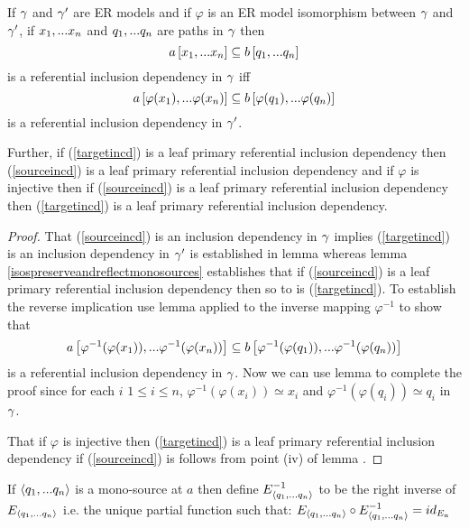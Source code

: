 \begin{lemma}
If $\gamma$ and $\gamma'$ are ER models and  if  $\varphi$ is an ER model isomorphism between $\gamma$  and $\gamma'$,  
if $x_1,...x_n$ and $q_1,...q_n$ are paths in 
$\gamma$
then 
\begin{equation}
\label{sourceincd}
a\left[x_1,...x_n\right]\subseteq b\left[q_1,...q_n\right]
\end{equation}
is a referential inclusion dependency in $\gamma$ 
iff 
\begin{equation}
\label{targetincd}
a\left[\varphi(x_1),...\varphi(x_n)\right]\subseteq b\left[\varphi(q_1),...\varphi(q_n)\right]
\end{equation}
is a referential inclusion dependency in $\gamma'$. 

Further, if (\ref{targetincd}) is a leaf primary referential inclusion dependency  then (\ref{sourceincd}) is a leaf primary referential inclusion dependency
and if $\varphi$ is injective then if (\ref{sourceincd}) is a leaf primary referential inclusion dependency
then (\ref{targetincd}) is a leaf primary referential inclusion dependency.
\end{lemma}
\begin{proof}
That (\ref{sourceincd}) is an inclusion dependency in $\gamma$ implies 
(\ref{targetincd}) is an inclusion dependency in $\gamma'$ is established in lemma
whereas lemma \ref{isospreserveandreflectmonosources}
establishes that if (\ref{sourceincd}) is a leaf primary referential inclusion dependency
then so to is (\ref{targetincd}). To establish the reverse implication use lemma
 applied to the inverse mapping $\varphi^{-1}$
to show that
\begin{equation}
a\left[\varphi^{-1}(\varphi(x_1)),...\varphi^{-1}(\varphi(x_n))\right]\subseteq b\left[\varphi^{-1}(\varphi(q_1)),...\varphi^{-1}(\varphi(q_n))\right]
\end{equation}
is a referential inclusion dependency in $\gamma$.
Now we can use lemma
 to complete the proof since for each  $i$ $ 1 \leq i \leq n$, $\varphi^{-1}(\varphi(x_i)) \simeq x_i$ and $\varphi^{-1}(\varphi(q_i))\simeq q_i$ in $\gamma$. 

That if $\varphi$ is injective then (\ref{targetincd}) is a leaf primary referential inclusion dependency
if (\ref{sourceincd}) is follows from point (iv) of lemma .
\end{proof}

If $\langle q_1,...q_n\rangle$ is a mono-source at $a$ then define $E_{\langle q_1,...q_n\rangle}^{-1}$ to be the right inverse of
$E_{\langle q_1,...q_n\rangle}$ i.e. the unique partial function such that:
$E_{\langle q_1,...q_n\rangle} \circ E_{\langle q_1,...q_n\rangle}^{-1} = id_{E_a}$

